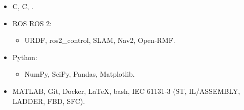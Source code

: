 \documentclass[10pt,a4paper,sans]{article} %
\newcommand{\CPP}{C\nolinebreak\hspace{-.05em}\raisebox{.4ex}{\tiny \textbf{+}}\nolinebreak\hspace{-.10em}\raisebox{.4ex}{\tiny \textbf{+}}\hspace{1mm}}
\newcommand{\Cs}{C\nolinebreak\raisebox{.4ex}{\scriptsize \textbf{\#}}}
\newif\ifen
\newif\iffr
\newif\ifpt
\newcommand{\en}[2][]{\ifen#2\else#1\fi}
\newcommand{\fr}[2][]{\iffr#2\else#1\fi}
\newcommand{\pt}[2][]{\ifpt#2\else#1\fi}
\begin{document}
\begin{tcolorbox}
\begin{minipage}[t]{0.32\textwidth}
\begin{tcolorbox}[grow to left by=0.6cm,colback=darkdarkgrey,colframe=darkdarkgrey,arc=0mm]
            \begin{itemize}
                \item[\faAngleRight] C, \en{Embedded }C\fr{ Embarqué}, \en{Modern }\CPP\fr{ moderne}.
                \item[\faAngleRight] ROS \en{and}\pt{e} ROS 2:
                    \begin{itemize}
                        \item URDF, ros2\_control, SLAM, Nav2, Open-RMF.
                    \end{itemize}
                \item[\faAngleRight] Python:
                    \begin{itemize}
                        \item NumPy, SciPy, Pandas, Matplotlib.
                    \end{itemize}
                \item[\faAngleRight] MATLAB, Git, Docker, \LaTeX, bash, IEC 61131-3 (ST, IL/ASSEMBLY, LADDER, FBD, SFC).
                
            \end{itemize}
            

\end{tcolorbox}
\end{minipage}
\end{tcolorbox}
\end{document}
